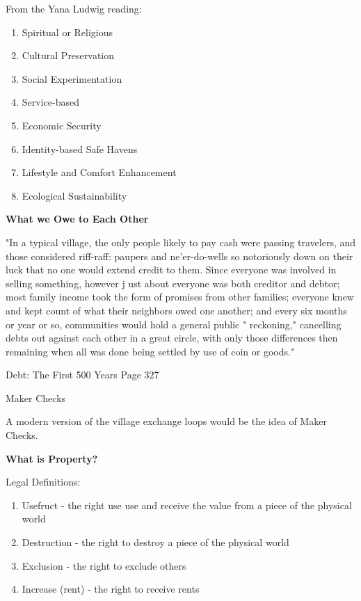 \documentclass{article}
\begin{document}
From the Yana Ludwig reading:

\begin{enumerate}
	\item Spiritual or Religious
	\item 	Cultural Preservation
	\item 	Social Experimentation
	\item 	Service-based
	\item 	Economic Security
	\item 	Identity-based Safe Havens
	\item 	Lifestyle and Comfort Enhancement
	\item 	Ecological Sustainability
\end{enumerate}


\pagebreak
{\huge \textbf{What we Owe to Each Other}}


"In a typical village, the only people likely to pay cash were passing
travelers, and those considered riff-raff: paupers and ne'er-do-wells so
notoriously down on their luck that no one would extend credit to
them. Since everyone was involved in selling something, however j ust
about everyone was both creditor and debtor; most family income took
the form of promises from other families; everyone knew and kept
count of what their neighbors owed one another; and every six months
or year or so, communities would hold a general public " reckoning,"
cancelling debts out against each other in a great circle, with only those
differences then remaining when all was done being settled by use of
coin or goods."

Debt: The First 500 Years Page 327

\large Maker Checks

A modern version of the village exchange loops would be the idea of Maker Checks. 




\pagebreak
{\huge \textbf{What is Property?}}

\large Legal Definitions:

\begin{enumerate}
	
	\item Usefruct - the right use use and receive the value from a piece of the physical world

	\item Destruction - the right to destroy a piece of the physical world

	\item Exclusion -  the right to exclude others
 
	\item Increase (rent) - the right to receive rents
\end{enumerate}
	
\end{document}
